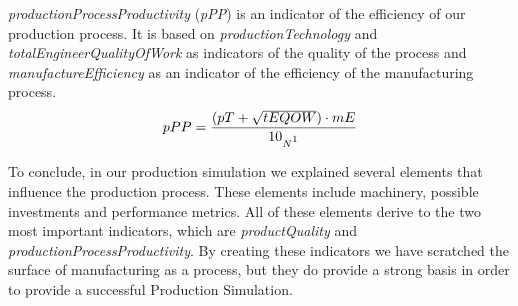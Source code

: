 \textit{productionProcessProductivity} (\textit{pPP}) is an indicator of the efficiency of our production  process. It is based on \textit{productionTechnology} and \textit{totalEngineerQualityOfWork} as indicators of the quality of the process and \textit{manufactureEfficiency} as an indicator of the efficiency of the manufacturing process.
\begin{equation}
pPP= \frac{(pT + \sqrt{tEQOW}) \cdot mE}{10_{N\footnotemark}}
\label{eq:PPP}
\end{equation}
 
To conclude, in our production simulation we explained several elements that influence the production process. These elements include machinery, possible investments and performance metrics. All of these elements derive to the two most important indicators, which are \textit{productQuality} and \textit{productionProcessProductivity}. By creating these indicators we have scratched the surface of manufacturing as a process, but they do provide a strong basis in order to provide a successful Production Simulation. 